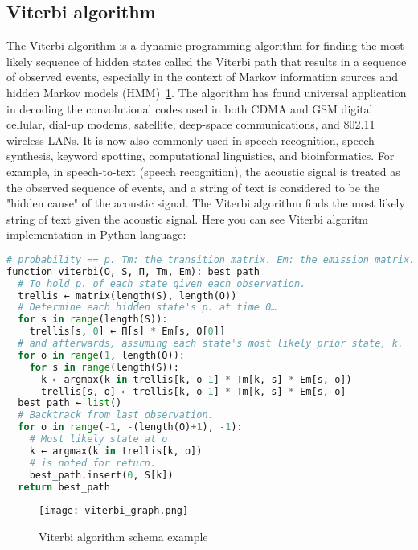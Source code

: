 \subsection{Viterbi algorithm} \label{subsec:viterbi}
The Viterbi algorithm is a dynamic programming algorithm for finding the most likely sequence of hidden
states called the Viterbi path that results in a sequence of observed events, especially in the
context of Markov information sources and hidden Markov models (HMM)~\ref{Viterbi schema}.
The algorithm has found universal application in decoding the convolutional codes used in
both CDMA and GSM digital cellular, dial-up modems, satellite, deep-space communications, and 802.11 wireless LANs.
It is now also commonly used in speech recognition, speech synthesis, keyword spotting, computational
linguistics, and bioinformatics.
For example, in speech-to-text (speech recognition), the acoustic signal is treated as the observed sequence of events,
and a string of text is considered to be the "hidden cause" of the acoustic signal.
The Viterbi algorithm finds the most likely string of text given the acoustic signal.
Here you can see Viterbi algoritm implementation in Python language: \\
\begin{lstlisting}[language=python]
# probability == p. Tm: the transition matrix. Em: the emission matrix.
function viterbi(O, S, Π, Tm, Em): best_path
  # To hold p. of each state given each observation.
  trellis ← matrix(length(S), length(O))
  # Determine each hidden state's p. at time 0…
  for s in range(length(S)):
    trellis[s, 0] ← Π[s] * Em[s, O[0]]
  # and afterwards, assuming each state's most likely prior state, k.
  for o in range(1, length(O)):
    for s in range(length(S)):
      k ← argmax(k in trellis[k, o-1] * Tm[k, s] * Em[s, o])
      trellis[s, o] ← trellis[k, o-1] * Tm[k, s] * Em[s, o]
  best_path ← list()
  # Backtrack from last observation.
  for o in range(-1, -(length(O)+1), -1):
    # Most likely state at o
    k ← argmax(k in trellis[k, o])
    # is noted for return.
    best_path.insert(0, S[k])
  return best_path
\end{lstlisting}
\begin{figure}[h!]
	\begin{center}
		\texttt{[image: viterbi\_graph.png]}
	\end{center}
	\caption{Viterbi algorithm schema example}
	\label{Viterbi schema}
\end{figure}

